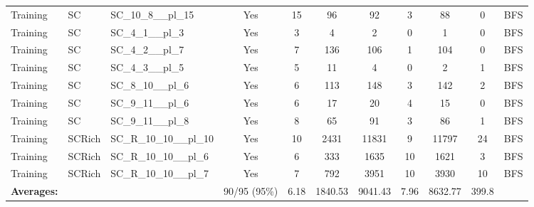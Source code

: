 \documentclass{article}
\begin{document}
\begin{tabular}{lllcccccccc}
Training & SC & SC\_10\_8\_\_pl\_15 & Yes & 15 & 96 & 92 & 3 & 88 & 0 & BFS \\
Training & SC & SC\_4\_1\_\_pl\_3 & Yes & 3 & 4 & 2 & 0 & 1 & 0 & BFS \\
Training & SC & SC\_4\_2\_\_pl\_7 & Yes & 7 & 136 & 106 & 1 & 104 & 0 & BFS \\
Training & SC & SC\_4\_3\_\_pl\_5 & Yes & 5 & 11 & 4 & 0 & 2 & 1 & BFS \\
Training & SC & SC\_8\_10\_\_pl\_6 & Yes & 6 & 113 & 148 & 3 & 142 & 2 & BFS \\
Training & SC & SC\_9\_11\_\_pl\_6 & Yes & 6 & 17 & 20 & 4 & 15 & 0 & BFS \\
Training & SC & SC\_9\_11\_\_pl\_8 & Yes & 8 & 65 & 91 & 3 & 86 & 1 & BFS \\
Training & SCRich & SC\_R\_10\_10\_\_pl\_10 & Yes & 10 & 2431 & 11831 & 9 & 11797 & 24 & BFS \\
Training & SCRich & SC\_R\_10\_10\_\_pl\_6 & Yes & 6 & 333 & 1635 & 10 & 1621 & 3 & BFS \\
Training & SCRich & SC\_R\_10\_10\_\_pl\_7 & Yes & 7 & 792 & 3951 & 10 & 3930 & 10 & BFS \\
\textbf{Averages:} & & & 90/95 (95\%) & 6.18 & 1840.53 & 9041.43 & 7.96 & 8632.77 & 399.8 & \\
\bottomrule
\end{tabular}
\newpage
\end{document}
